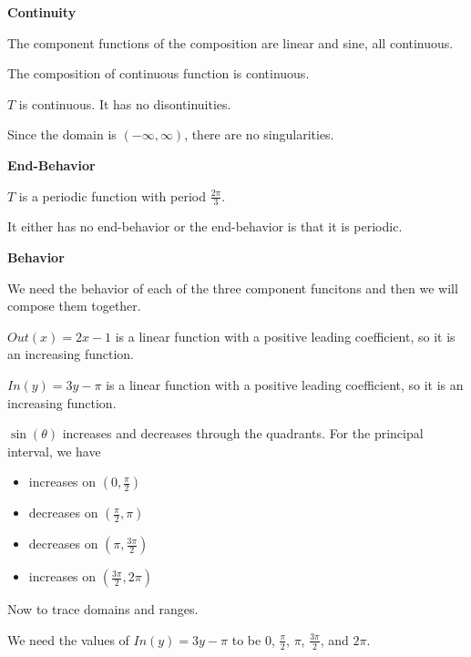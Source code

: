 \documentclass{ximera}
\begin{document}
\textbf{\textcolor{blue!55!black}{Continuity}}


The component functions of the composition are linear and sine, all continuous. 

The composition of continuous function is continuous.

$T$ is continuous. It has no disontinuities. 


Since the domain is $(-\infty, \infty)$, there are no singularities. 








\textbf{\textcolor{blue!55!black}{End-Behavior}}


$T$ is a periodic function with period $\frac{2\pi}{3}$. 

It either has no end-behavior or the end-behavior is that it is periodic.












\textbf{\textcolor{blue!55!black}{Behavior}}


We need the behavior of each of the three component funcitons and then we will compose them together. 




$Out(x) = 2x - 1$ is a linear function with a positive leading coefficient, so it is an increasing function.


$In(y) = 3y - \pi$ is a linear function with a positive leading coefficient, so it is an increasing function.


$\sin(\theta)$ increases and decreases through the quadrants. For the principal interval, we have


\begin{itemize}
  \item increases on $\left( 0, \frac{\pi}{2} \right)$
  \item decreases on $\left( \frac{\pi}{2}, \pi \right)$
  \item decreases on $\left( \pi, \frac{3\pi}{2} \right)$
  \item increases on $\left( \frac{3\pi}{2}, 2\pi \right)$
\end{itemize}


Now to trace domains and ranges.


We need the values of $In(y) = 3y - \pi$ to be $0$, $\frac{\pi}{2}$, $\pi$, $\frac{3\pi}{2}$, and $2\pi$. 
\end{document}
